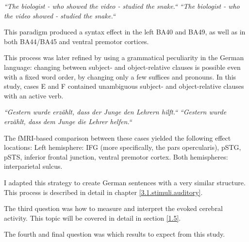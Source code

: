 \begin{center}
\emph{``The biologist - who showed the video - studied the snake.``}
\emph{``The biologist - who the video showed - studied the snake.``}
\end{center}


This paradigm produced a syntax effect in the left BA40 and BA49, as well as in both BA44/BA45 and ventral premotor cortices.

This process was later refined \cite{1.3.Bornkessel} by using a grammatical peculiarity in the German language: changing between subject- and object-relative clauses is possible even with a fixed word order, by changing only a few suffices and pronouns.
In this study, cases E and F contained unambiguous subject- and object-relative clauses with an active verb.


\begin{center}
\emph{``Gestern wurde erzählt, dass der Junge den Lehrern hilft.``}
\emph{``Gestern wurde erzählt, dass dem Junge die Lehrer helfen.``}
\end{center}


The fMRI-based comparison between these cases yielded the following effect locations:
Left hemisphere: IFG (more specifically, the pars opercularis), pSTG, pSTS, inferior frontal junction, ventral premotor cortex.
Both hemispheres: interparietal sulcus.

I adapted this strategy to create German sentences with a very similar structure.
This process is described in detail in chapter \ref{3.1.stimuli.auditory}.


The third question was how to measure and interpret the evoked cerebral activity.
This topic will be covered in detail in section \ref{1.5}.


The fourth and final question was which results to expect from this study.
